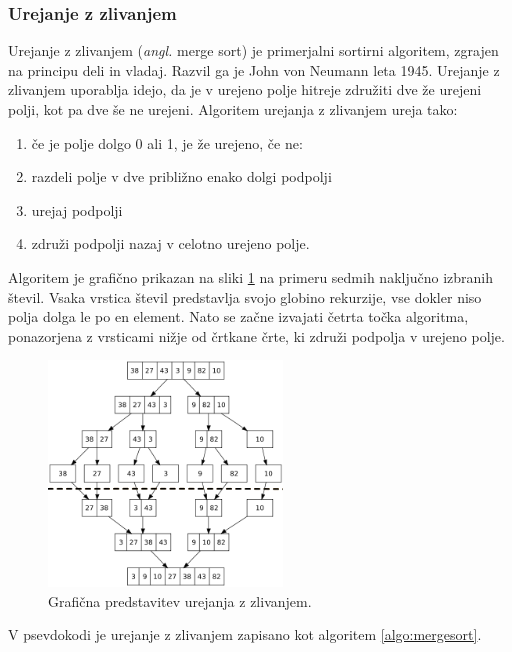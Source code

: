 \documentclass[a4paper,oneside,12pt]{article}
\begin{document}
\subsubsection{Urejanje z zlivanjem}
\label{chapter:mergesort}
Urejanje z zlivanjem (\emph{angl.} merge sort) je primerjalni sortirni algoritem, 
zgrajen na principu deli in vladaj. Razvil ga je John von Neumann leta 1945.
Urejanje z zlivanjem uporablja idejo, da je v urejeno polje hitreje združiti dve že
urejeni polji, kot pa dve še ne urejeni. 
Algoritem urejanja z zlivanjem ureja tako:
\begin{enumerate}
  \item če je polje dolgo 0 ali 1, je že urejeno, če ne:
  \item razdeli polje v dve približno enako dolgi podpolji
  \item urejaj podpolji 
  \item združi podpolji nazaj v celotno urejeno polje.
\end{enumerate}

Algoritem je grafično prikazan na sliki \ref{fig:mergesortimage} na primeru sedmih
naključno izbranih števil.
Vsaka vrstica števil predstavlja svojo globino rekurzije, vse dokler niso polja dolga le
po en element. Nato se začne izvajati četrta točka algoritma, ponazorjena z vrsticami
nižje od črtkane črte, ki združi podpolja v urejeno polje.

\begin{figure}[h]
    \begin{center}
        \includegraphics[height=60mm]{slike/merge_sort.png}
    \end{center}
    \vspace{-0.7cm}
    \caption[Urejanje z zlivanjem]{Grafična predstavitev urejanja z zlivanjem.}
    \label{fig:mergesortimage}
\end{figure}

V psevdokodi je urejanje z zlivanjem zapisano kot algoritem \ref{algo:mergesort}. 
\end{document}
